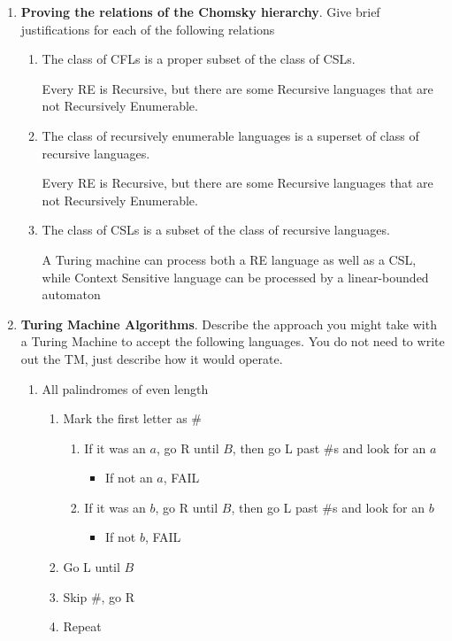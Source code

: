 \documentclass[12pt]{scrbook}
\begin{document}
\begin{enumerate}
  \item \textbf{Proving the relations of the Chomsky hierarchy}.  Give brief
    justifications for each of the following relations
    \begin{enumerate}
      \item The class of CFLs is a proper subset of the class of CSLs.

        Every RE is Recursive, but there are some Recursive languages that are
        not Recursively Enumerable.

      \item The class of recursively enumerable languages is a superset of class of recursive languages.

        Every RE is Recursive, but there are some Recursive languages that are
        not Recursively Enumerable.

      \item The class of CSLs is a subset of the class of recursive languages.

        A Turing machine can process both a RE language as well as a CSL, while
        Context Sensitive language can be processed by a linear-bounded automaton

    \end{enumerate}
  \item \textbf{Turing Machine Algorithms}.  Describe the approach you might take with a
    Turing Machine to accept the following languages. You do not need to
    write out the TM, just describe how it would operate.

      \begin{enumerate}
        \item All palindromes of even length

          \begin{enumerate}
            \item Mark the first letter as \#
              \begin{enumerate}
                \item If it was an $a$, go R until $B$, then go L past \#s
                  and look for an $a$
                  \begin{itemize}
                    \item If not an $a$, FAIL
                  \end{itemize}
                \item If it was an $b$, go R until $B$, then go L past \#s
                  and look for an $b$
                  \begin{itemize}
                    \item If not $b$, FAIL
                  \end{itemize}
              \end{enumerate}
            \item Go L until $B$
            \item Skip \#, go R
            \item Repeat
          \end{enumerate}


\end{enumerate}
\end{enumerate}
\end{document}
